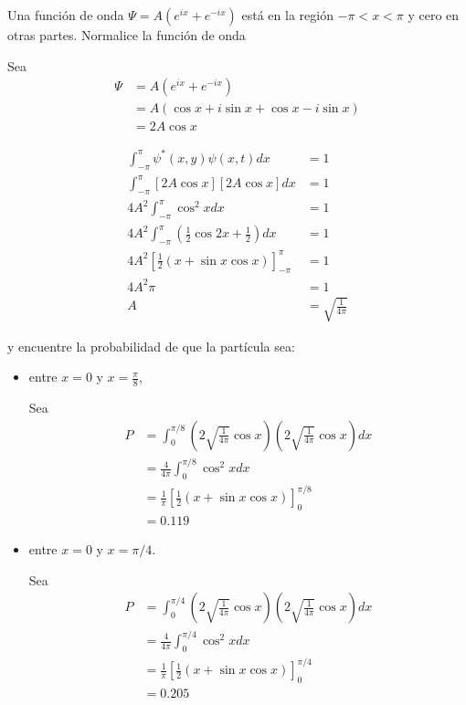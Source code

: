 \begin{problema}
    Una función de onda $\Psi=A\left(e^{i x}+e^{-i x}\right)$ está en la región $-\pi<x<\pi$ y cero en otras partes. Normalice la función de onda 
    
    \begin{sol}
        Sea 
        \begin{align*}
            \Psi &= A(e^{ix}+e^{-ix})\\
                 &= A\left(\cos x+i\sin x +\cos x -i\sin x\right)\\
                 &= 2A\cos x
        \end{align*}
       
        \begin{align*}
            \int_{-\pi}^\pi \psi^*(x,y)\psi(x,t)dx&=1\\
            \int_{-\pi}^\pi \left[2A\cos x\right]\left[2A\cos x\right]dx&=1\\
            4A^2\int_{-\pi}^\pi \cos^2 x dx &= 1\\
            4A^2\int_{-\pi}^\pi \left(\frac{1}{2}\cos2x + \frac{1}{2}\right) dx &= 1\\
            4A^2\left[\frac{1}{2}\left(x+\sin x \cos x\right)\right]_{-\pi}^\pi &= 1\\
            4A^2\pi &= 1\\
            A &= \sqrt{\frac{1}{4\pi}}
        \end{align*}
    \end{sol}
    y encuentre la probabilidad de que la partícula sea:
    \begin{itemize}
        \item entre $x=0$ y $x=\frac{\pi}{8}$,
        \begin{sol}
            Sea 
            \begin{align*}
                P &= \int_0^{\pi/8}\left(2\sqrt{\frac{1}{4\pi}}\cos x\right)\left(2\sqrt{\frac{1}{4\pi}}\cos x\right)dx\\
                 &= \frac{4}{4\pi}\int_{0}^{\pi/8}\cos^2 x dx\\
                 &= \frac{1}{\pi}\left[\frac{1}{2}\left(x+\sin x \cos x\right)\right]_{0}^{\pi/8}\\
                 &=0.119
            \end{align*}
        \end{sol}
        \item entre $x=0$ y $x=\pi / 4$.
        \begin{sol}
            Sea 
            \begin{align*}
                P &= \int_0^{\pi/4}\left(2\sqrt{\frac{1}{4\pi}}\cos x\right)\left(2\sqrt{\frac{1}{4\pi}}\cos x\right)dx\\
                 &= \frac{4}{4\pi}\int_{0}^{\pi/4}\cos^2 x dx\\
                 &= \frac{1}{\pi}\left[\frac{1}{2}\left(x+\sin x \cos x\right)\right]_{0}^{\pi/4}\\
                 &=0.205
            \end{align*}
        \end{sol}
    \end{itemize}
     

\end{problema}
